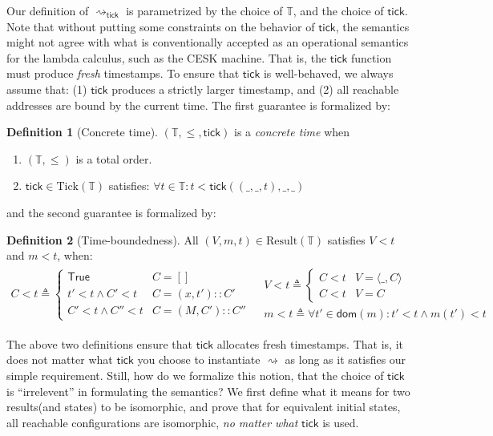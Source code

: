 \documentclass[acmsmall,review]{acmart}\settopmatter{printfolios=true,printccs=false,printacmref=false}
\theoremstyle{definition}
\newtheorem{definition}{Definition}[section]
\newcommand*{\cons}{::}
\newcommand*{\Time}{\mathbb{T}}
\newcommand*{\mem}{m}
\newcommand*{\Result}{\text{Result}}
\newcommand*{\Tick}{\text{Tick}}
\newcommand*{\tick}{\mathsf{tick}}
\begin{document}
Our definition of $\rightsquigarrow_\tick$ is parametrized by the choice of $\Time$, and the choice of $\tick$.
Note that without putting some constraints on the behavior of $\tick$, the semantics might not agree with what is conventionally accepted as an operational semantics for the lambda calculus, such as the CESK machine.
That is, the $\tick$ function must produce \emph{fresh} timestamps.
To ensure that $\tick$ is well-behaved, we always assume that: (1) $\tick$ produces a strictly larger timestamp, and (2) all reachable addresses are bound by the current time.
The first guarantee is formalized by:
\begin{definition}[Concrete time]
  $(\Time, \le, \tick)$ is a \emph{concrete time} when
  \begin{enumerate}
    \item $(\Time, \le)$ is a total order.
    \item $\tick\in\Tick(\Time)$ satisfies: $\forall t\in\Time:t <\tick((\_,\_,t),\_,\_)$
  \end{enumerate}
\end{definition}
and the second guarantee is formalized by:
\begin{definition}[Time-boundedness]
  All $(V,\mem,t)\in\Result(\Time)$ satisfies $V < t$ and $\mem < t$, when:
  \[
    \begin{array}{cc}
      C < t\triangleq
      \begin{cases}
        \mathsf{True}        & C=[]              \\
        t' < t\wedge C' < t  & C=(x,t')\cons C'  \\
        C' < t\wedge C'' < t & C=(M,C')\cons C''
      \end{cases}
       &
      \begin{array}{l}
        V < t\triangleq
        \begin{cases}
          C < t & V=\langle\_,C\rangle \\
          C < t & V=C
        \end{cases} \\
        \mem < t\triangleq\forall t'\in\mathsf{dom}(\mem):t'<t\wedge\mem(t') < t
      \end{array}
    \end{array}
  \]
\end{definition}

The above two definitions ensure that $\tick$ allocates fresh timestamps.
That is, it does not matter what $\tick$ you choose to instantiate $\rightsquigarrow$ as long as it satisfies our simple requirement.
Still, how do we formalize this notion, that the choice of $\tick$ is ``irrelevent'' in formulating the semantics?
We first define what it means for two results(and states) to be isomorphic, and prove that for equivalent initial states, all reachable configurations are isomorphic, \emph{no matter what} $\tick$ is used.
\end{document}
